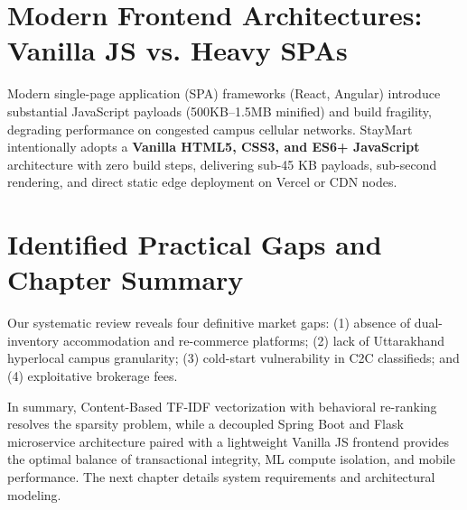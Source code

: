 \section{Modern Frontend Architectures: Vanilla JS vs. Heavy SPAs}
Modern single-page application (SPA) frameworks (React, Angular) introduce substantial JavaScript payloads (500KB--1.5MB minified) and build fragility, degrading performance on congested campus cellular networks. StayMart intentionally adopts a \textbf{Vanilla HTML5, CSS3, and ES6+ JavaScript} architecture with zero build steps, delivering sub-45 KB payloads, sub-second rendering, and direct static edge deployment on Vercel or CDN nodes.

\section{Identified Practical Gaps and Chapter Summary}
Our systematic review reveals four definitive market gaps: (1) absence of dual-inventory accommodation and re-commerce platforms; (2) lack of Uttarakhand hyperlocal campus granularity; (3) cold-start vulnerability in C2C classifieds; and (4) exploitative brokerage fees. 

In summary, Content-Based TF-IDF vectorization with behavioral re-ranking resolves the sparsity problem, while a decoupled Spring Boot and Flask microservice architecture paired with a lightweight Vanilla JS frontend provides the optimal balance of transactional integrity, ML compute isolation, and mobile performance. The next chapter details system requirements and architectural modeling.
